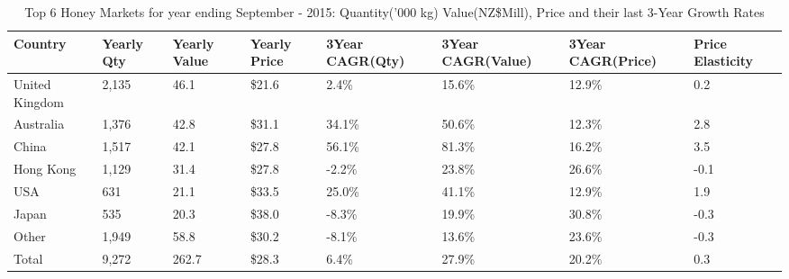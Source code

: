 \begin{table}[ht]
\centering
{\scriptsize
\begin{tabular}[t]{p{1.8cm}>{\hfill}p{1.4cm}>{\hfill}p{1.4cm}>{\hfill}p{1.6cm}>{\hfill}p{1.9cm}>{\hfill}p{2cm}>{\hfill}p{1.9cm}>{\hfill}p{1.5cm}}
 \textbf{Country} & \textbf{Yearly Qty} & \textbf{Yearly Value} & \textbf{Yearly Price} & \textbf{3Year CAGR(Qty)} & \textbf{3Year CAGR(Value)} & \textbf{3Year CAGR(Price)} & \textbf{Price Elasticity} \\
\hline
United Kingdom & 2,135 & 46.1 & \$21.6 & 2.4\% & 15.6\% & 12.9\% & 0.2 \\  
Australia & 1,376 & 42.8 & \$31.1 & 34.1\% & 50.6\% & 12.3\% & 2.8 \\  
China & 1,517 & 42.1 & \$27.8 & 56.1\% & 81.3\% & 16.2\% & 3.5 \\  
Hong Kong & 1,129 & 31.4 & \$27.8 & -2.2\% & 23.8\% & 26.6\% & -0.1 \\  
USA & 631 & 21.1 & \$33.5 & 25.0\% & 41.1\% & 12.9\% & 1.9 \\  
Japan & 535 & 20.3 & \$38.0 & -8.3\% & 19.9\% & 30.8\% & -0.3 \\  
Other & 1,949 & 58.8 & \$30.2 & -8.1\% & 13.6\% & 23.6\% & -0.3 \\  
Total & 9,272 & 262.7 & \$28.3 & 6.4\% & 27.9\% & 20.2\% & 0.3 \\  
\hline
\end{tabular}
}
\caption{\scriptsize Top 6 Honey Markets for year ending September - 2015: Quantity('000 kg) Value(NZ\$Mill), Price and their last 3-Year Growth Rates}
\end{table}

